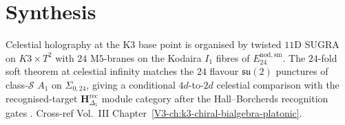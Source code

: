 \section{Synthesis}
\label{sec:ch-supplement}

\begin{remark}
\label{rem:ch-1}
Celestial holography at the K3 base point is organised by
twisted $11$D SUGRA on $K3\times T^2$ with $24$ M$5$-branes on the
Kodaira $I_1$ fibres of $E^{\mathrm{nod,sm}}_{24}$. The $24$-fold soft
theorem at celestial infinity matches the $24$ flavour
$\mathfrak{su}(2)$ punctures of class-$\mathcal S$ $A_1$ on
$\Sigma_{0,24}$, giving a conditional $4d$-to-$2d$ celestial comparison
with the recognised-target
$\mathbf H_{\Delta_5}^{\mathrm{rec}}$ module category after the
Hall--Borcherds recognition gates
\cite{EguchiOoguriTachikawa2010,Gaiotto2009}.
Cross-ref Vol.~III Chapter~\ref{V3-ch:k3-chiral-bialgebra-platonic}.
\end{remark}
